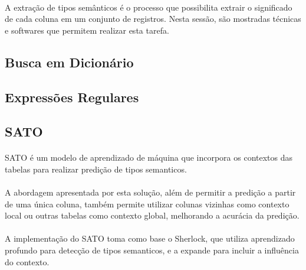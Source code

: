 \paragraph{} A extração de tipos semânticos é o processo que possibilita extrair o significado de cada coluna em um conjunto de registros.
Nesta sessão, são mostradas técnicas e softwares que permitem realizar esta tarefa.

\subsection{Busca em Dicionário}

\paragraph{} 

\subsection{Expressões Regulares}

\paragraph{}

\subsection{SATO}

\paragraph{} SATO\cite{zhang2019sato} é um modelo de aprendizado de máquina que incorpora os contextos das tabelas para realizar predição de tipos semanticos.

\paragraph{} A abordagem apresentada por esta solução, além de permitir a predição a partir de uma única coluna, também permite utilizar colunas vizinhas como contexto local ou outras tabelas como contexto global, melhorando a acurácia da predição.

\paragraph{} A implementação do SATO toma como base o Sherlock\cite{hulsebos2019sherlock}, que utiliza aprendizado profundo para detecção de tipos semanticos, e a expande para incluir a influência do contexto.

